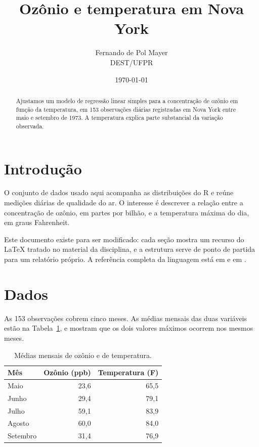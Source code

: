 \documentclass[12pt,a4paper]{article}
\title{Ozônio e temperatura em Nova York}
\author{Fernando de Pol Mayer \\ \small DEST/UFPR}
\date{\today}
\begin{document}
\maketitle


\begin{abstract}
  Ajustamos um modelo de regressão linear simples para a concentração de
  ozônio em função da temperatura, em 153 observações diárias registradas
  em Nova York entre maio e setembro de 1973. A temperatura explica parte
  substancial da variação observada.
\end{abstract}

\section{Introdução}
\label{sec:introducao}

O conjunto de dados usado aqui acompanha as distribuições do R
\citep{rcore} e reúne medições diárias de qualidade do ar. O interesse é
descrever a relação entre a concentração de ozônio, em partes por bilhão,
e a temperatura máxima do dia, em graus Fahrenheit.

Este documento existe para ser modificado: cada seção mostra um recurso do
LaTeX tratado no material da disciplina, e a estrutura serve de ponto de
partida para um relatório próprio. A referência completa da linguagem está
em \citet{lamport1994} e em \citet{mittelbach2023}.

\section{Dados}
\label{sec:dados}

As 153 observações cobrem cinco meses. As médias mensais das duas
variáveis estão na Tabela~\ref{tab:medias}, e mostram que os dois valores
máximos ocorrem nos mesmos meses.

\begin{table}[htbp]
  \centering
  \caption{Médias mensais de ozônio e de temperatura.}
  \label{tab:medias}
  \begin{tabular}{lrr}
    \toprule
    Mês      & Ozônio (ppb) & Temperatura (F) \\
    \midrule
    Maio     & 23,6 & 65,5 \\
    Junho    & 29,4 & 79,1 \\
    Julho    & 59,1 & 83,9 \\
    Agosto   & 60,0 & 84,0 \\
    Setembro & 31,4 & 76,9 \\
    \bottomrule
  \end{tabular}
\end{table}
\end{document}

